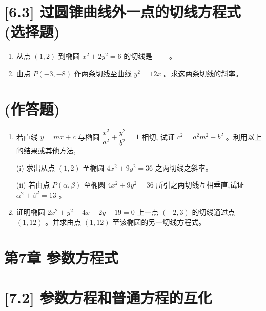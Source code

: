 \documentclass[10pt]{article}
\begin{document}
\section*{[6.3] 过圆锥曲线外一点的切线方程式 (选择题)}
\begin{enumerate}
  \item 从点 $(1,2)$ 到椭圆 $x^{2}+2 y^{2}=6$ 的切线是 $\qquad$。
  \item 由点 $P(-3,-8)$ 作两条切线至曲线 $y^{2}=12 x$ 。求这两条切线的斜率。
\end{enumerate}

\section*{(作答题)}
\begin{enumerate}
  \item 若直线 $y=m x+c$ 与椭圆 $\dfrac{x^{2}}{a^{2}}+\dfrac{y^{2}}{b^{2}}=1$ 相切, 试证 $c^{2}=a^{2} m^{2}+b^{2}$ 。利用以上的结果或其他方法,

(i) 求出从点 $(1,2)$ 至椭圆 $4 x^{2}+9 y^{2}=36$ 之两切线之斜率。

(ii) 若由点 $P(\alpha, \beta)$ 至椭圆 $4 x^{2}+9 y^{2}=36$ 所引之两切线互相垂直,试证 $\alpha^{2}+\beta^{2}=13$ 。
  \item 证明椭圆 $2 x^{2}+y^{2}-4 x-2 y-19=0$ 上一点 $(-2,3)$ 的切线通过点 $(1,12)$ 。并求由点 $(1,12)$ 至该椭圆的另一切线方程式。
\end{enumerate}

\section*{第7章 参数方程式}
\section*{[7.2] 参数方程和普通方程的互化}
\end{document}
